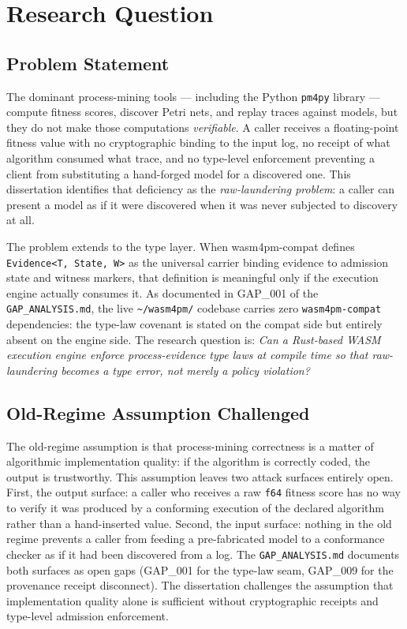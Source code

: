 \section{Research Question}
\label{sec:sources-wasm4pm-research-question}

\subsection{Problem Statement}
\label{sec:sources-wasm4pm-rq-problem}

The dominant process-mining tools — including the Python \texttt{pm4py} library — compute fitness
scores, discover Petri nets, and replay traces against models, but they do not make those
computations \emph{verifiable}. A caller receives a floating-point fitness value with no
cryptographic binding to the input log, no receipt of what algorithm consumed what trace, and no
type-level enforcement preventing a client from substituting a hand-forged model for a discovered
one. This dissertation identifies that deficiency as the \emph{raw-laundering problem}: a caller
can present a model as if it were discovered when it was never subjected to discovery at all.

The problem extends to the type layer. When wasm4pm-compat defines \texttt{Evidence<T,~State,~W>}
as the universal carrier binding evidence to admission state and witness markers, that definition
is meaningful only if the execution engine actually consumes it. As documented in GAP\_001 of the
\texttt{GAP\_ANALYSIS.md}, the live \texttt{\textasciitilde/wasm4pm/} codebase carries zero
\texttt{wasm4pm-compat} dependencies: the type-law covenant is stated on the compat side but
entirely absent on the engine side. The research question is: \emph{Can a Rust-based WASM
execution engine enforce process-evidence type laws at compile time so that raw-laundering becomes
a type error, not merely a policy violation?}

\subsection{Old-Regime Assumption Challenged}
\label{sec:sources-wasm4pm-rq-old-regime}

The old-regime assumption is that process-mining correctness is a matter of algorithmic
implementation quality: if the algorithm is correctly coded, the output is trustworthy. This
assumption leaves two attack surfaces entirely open. First, the output surface: a caller who
receives a raw \texttt{f64} fitness score has no way to verify it was produced by a conforming
execution of the declared algorithm rather than a hand-inserted value. Second, the input surface:
nothing in the old regime prevents a caller from feeding a pre-fabricated model to a conformance
checker as if it had been discovered from a log. The \texttt{GAP\_ANALYSIS.md} documents both
surfaces as open gaps (GAP\_001 for the type-law seam, GAP\_009 for the provenance receipt
disconnect). The dissertation challenges the assumption that implementation quality alone
is sufficient without cryptographic receipts and type-level admission enforcement.

